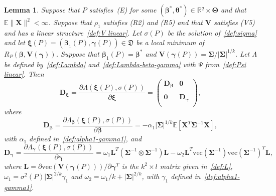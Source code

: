 \documentclass{article}
\numberwithin{equation}{section}
\theoremstyle{plain}
\newtheorem{lemma}{Lemma}
\newcommand{\R}{\mathbb{R}}
\newcommand{\vc}{\mathrm{vec}}
\newcommand{\bbeta}{\bm\beta}
\newcommand{\btheta}{\bm\theta}
\newcommand{\bxi}{\bm\xi}
\newcommand{\bgamma}{\bm\gamma}
\newcommand{\bSigma}{\mathbf{\Sigma}}
\newcommand{\bTheta}{\bm\Theta}
\newcommand{\bX}{\mathbf{X}}
\newcommand{\bV}{\mathbf{V}}
\newcommand{\bD}{\mathbf{D}}
\newcommand{\bL}{\mathbf{L}}
\newcommand{\E}{\mathbb{E}}
\begin{document}
\begin{lemma}
\label{lem:Lambda derivative}
Suppose that $P$ satisfies~(E) for some $(\bbeta^*,\btheta^*)\in\R^q\times\bTheta$
and that $\E\|\bX\|^2<\infty$.
Suppose that $\rho_1$ satisfies (R2) and (R5) and that $\bV$ satisfies (V5) and has
a linear structure~\eqref{def:V linear}.
Let $\sigma(P)$ be the solution of~\eqref{def:sigma} and let $\bxi(P)=(\bbeta_1(P),\bgamma(P))\in \mathfrak{D}$ be
a local minimum of $R_P(\bbeta,\bV(\bgamma))$.
Suppose that $\bbeta_1(P)=\bbeta^*$ and $\bV(\bgamma(P))=\bSigma/|\bSigma|^{1/k}$.
Let $\Lambda$ be defined by~\eqref{def:Lambda} and~\eqref{def:Lambda-beta-gamma} with $\Psi$ 
from~\eqref{def:Psi linear}.
Then 
\[
\bD_{\bxi}
=
\frac{\partial \Lambda(\bxi(P),\sigma(P))}{\partial \bxi}
=
\left(
  \begin{array}{cc}
\bD_{\bbeta} & \mathbf{0}\\
    \\
\mathbf{0} & \bD_{\bgamma} \\
  \end{array}
\right),
\]
where
\begin{equation}
\label{def:derivative Lambda beta}
\bD_{\bbeta}=
\frac{\partial\Lambda_{\bbeta}(\bxi(P),\sigma(P))}{\partial \bbeta}
=
-\alpha_1
|\bSigma|^{1/k}
\E\left[
\bX^T\bSigma^{-1}\bX
\right],
\end{equation}
with $\alpha_1$ defined in~\eqref{def:alpha1-gamma1}, 
and
\begin{equation}
\label{def:derivative Lambda gamma}
\bD_{\bgamma}=
\frac{\partial\Lambda_{\bgamma}(\bxi(P),\sigma(P))}{\partial \bgamma}
=
\omega_1\bL^T\left(\bSigma^{-1}\otimes\bSigma^{-1}\right)\bL
-
\omega_2\bL^T
\vc(\bSigma^{-1})
\vc(\bSigma^{-1})^T
\bL,
\end{equation}
where $\bL=\partial\vc(\bV(\bgamma(P)))/\partial\bgamma^T$ is the $k^2\times l$ matrix given in~\eqref{def:L},
$\omega_1=\sigma^2(P)|\bSigma|^{2/k}\gamma_1$ and $\omega_2=\omega_1/k+|\bSigma|^{2/k}$, 
with $\gamma_1$ defined in~\eqref{def:alpha1-gamma1}.
\end{lemma}
\end{document}
